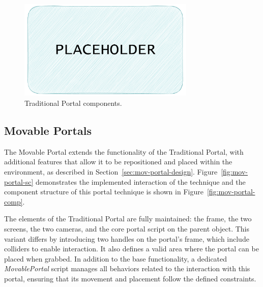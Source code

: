 \begin{figure}[t]
    \centering
     \includegraphics[width=0.75\textwidth]{NOVAthesisFiles/Images/placeholder.pdf}
     \caption[Traditional Portal components.]
     {Traditional Portal components.}
     \label{fig:trad-portal-comp}
\end{figure}
    
\subsection{Movable Portals}
\label{sec:mov-portals}

The Movable Portal extends the functionality of the Traditional Portal, with additional features that allow it to be repositioned and 
placed within the environment, as described in Section~\ref{sec:mov-portal-design}. Figure~\ref{fig:mov-portal-sc} demonstrates the implemented interaction of the 
technique and the component structure of this portal technique is shown in Figure~\ref{fig:mov-portal-comp}.

The elements of the Traditional Portal are fully maintained: the frame, the two screens, the two cameras, and the core portal script 
on the parent object. This variant differs by introducing two handles on the portal's frame, which include colliders to enable interaction.
It also defines a valid area where the portal can be placed when grabbed. In addition to the base functionality, a dedicated
\textit{MovablePortal} script manages all behaviors related to the interaction with this portal, ensuring that its movement and placement 
follow the defined constraints.

